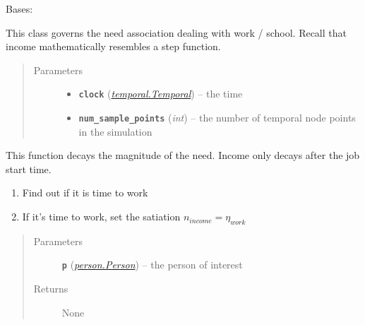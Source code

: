 \documentclass[letterpaper,10pt,english]{sphinxmanual}
\begin{document}
\begin{fulllineitems}
\label{income:income.Income}
Bases: {\hyperref[need:need.Need]{\emph{}}}

This class governs the need association dealing with work / school. Recall that income mathematically     resembles a step function.
\begin{quote}\begin{description}
\item[{Parameters}] \leavevmode\begin{itemize}
\item {} 
\textbf{\texttt{clock}} ({\hyperref[temporal:temporal.Temporal]{\emph{\emph{temporal.Temporal}}}}) -- the time

\item {} 
\textbf{\texttt{num\_sample\_points}} (\emph{int}) -- the number of temporal node points in the simulation

\end{itemize}

\end{description}\end{quote}

\begin{fulllineitems}
\label{income:income.Income.decay}
This function decays the magnitude of the need. Income only decays after the job start time.
\begin{enumerate}
\item {} 
Find out if it is time to work

\item {} 
If it's time to work, set the satiation \(n_{income} = \eta_{work}\)

\end{enumerate}
\begin{quote}\begin{description}
\item[{Parameters}] \leavevmode
\textbf{\texttt{p}} ({\hyperref[person:person.Person]{\emph{\emph{person.Person}}}}) -- the person of interest

\item[{Returns}] \leavevmode
None

\end{description}\end{quote}


\end{fulllineitems}
\end{fulllineitems}
\end{document}

